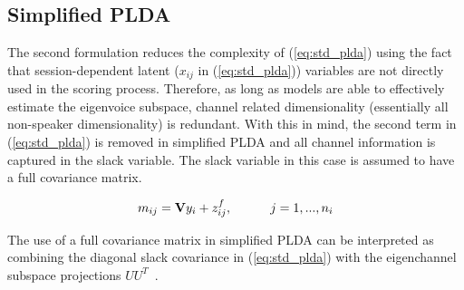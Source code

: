 \subsection{Simplified PLDA}
\label{ssec:simplified_plda}
The second formulation reduces the complexity of (\ref{eq:std_plda}) using the fact that session-dependent latent ($x_{ij}$ in (\ref{eq:std_plda})) variables are not directly used in the scoring process. 
Therefore, as long as models are able to effectively estimate the eigenvoice subspace, channel related dimensionality (essentially all non-speaker dimensionality) is redundant. 
With this in mind, the second term in (\ref{eq:std_plda}) is removed in simplified PLDA and all channel information is captured in the slack variable. 
The slack variable in this case is assumed to have a full covariance matrix.

\begin{equation}
\label{eq:simple_plda}
m_{ij} = {\bf V}y_i+z^f_{ij},  \hspace{30pt} j=1,...,n_i
\end{equation}

The use of a full covariance matrix in simplified PLDA can be interpreted as combining the diagonal slack covariance in (\ref{eq:std_plda}) with the eigenchannel subspace projections $UU^T$~\cite{sizov2014unifying}.


